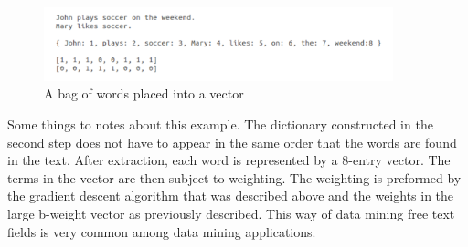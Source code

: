 \documentclass[conference]{IEEEtran}
\begin{document}
\begin{figure}[tb!]
\centering
\includegraphics[width=0.9\textwidth]{images/bag.png}
\caption{A bag of words placed into a vector\label{fig:bag}}
\end{figure}

Some things to notes about this example. The dictionary constructed in the
second step does not have to appear in the same order that the words are found
in the text. After extraction, each word is represented by a 8-entry vector. The
terms in the vector are then subject to weighting. The weighting is preformed
by the gradient descent algorithm that was described above and the weights in
the large b-weight vector as previously described. This way of data mining free
text fields is very common among data mining applications.
\end{document}

